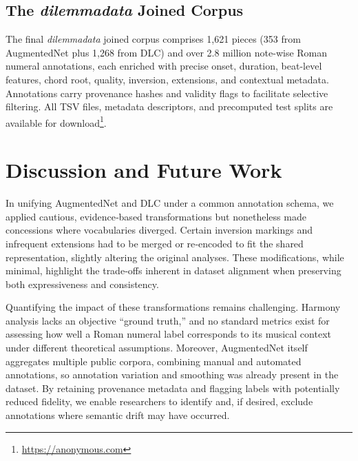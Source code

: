 \documentclass[sigconf]{acmart} %
\begin{document}

\subsection{The \textit{dilemmadata} Joined Corpus}

The final \textit{dilemmadata} joined corpus comprises 1,621 pieces (353 from AugmentedNet plus 1,268 from DLC) and over 2.8 million note-wise Roman numeral annotations, each enriched with precise onset, duration, beat-level features, chord root, quality, inversion, extensions, and contextual metadata. Annotations carry provenance hashes and validity flags to facilitate selective filtering.  All TSV files, metadata descriptors, and precomputed test splits are available for download\footnote{\url{https://anonymous.com}}.

\section{Discussion and Future Work}

In unifying AugmentedNet and DLC under a common annotation schema, we applied cautious, evidence‐based transformations but nonetheless made concessions where vocabularies diverged. Certain inversion markings and infrequent extensions had to be merged or re‐encoded to fit the shared representation, slightly altering the original analyses. These modifications, while minimal, highlight the trade‐offs inherent in dataset alignment when preserving both expressiveness and consistency.

Quantifying the impact of these transformations remains challenging. Harmony analysis lacks an objective “ground truth,” and no standard metrics exist for assessing how well a Roman numeral label corresponds to its musical context under different theoretical assumptions. Moreover, AugmentedNet itself aggregates multiple public corpora, combining manual and automated annotations, so annotation variation and smoothing was already present in the dataset. By retaining provenance metadata and flagging labels with potentially reduced fidelity, we enable researchers to identify and, if desired, exclude annotations where semantic drift may have occurred.
\end{document}
